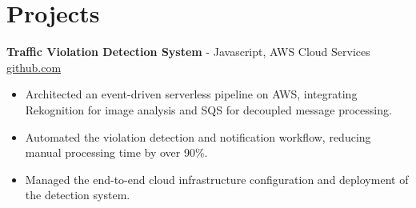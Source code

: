 \documentclass[11pt]{article}       %
\begin{document}

\vspace{-18.5pt}

\section*{Projects}

\textbf{Traffic Violation Detection System}{ - Javascript, AWS Cloud Services} \hfill \href{https://github.com/Monica20030707/AWS_rekonigition-N-read-database}{github.com} \\
\vspace{-9pt}
\begin{itemize}
  \item Architected an event-driven serverless pipeline on AWS, integrating Rekognition for image analysis and SQS for decoupled message processing.
  \item Automated the violation detection and notification workflow, reducing manual processing time by over 90\%.
  \item Managed the end-to-end cloud infrastructure configuration and deployment of the detection system.
\end{itemize}
\end{document}
